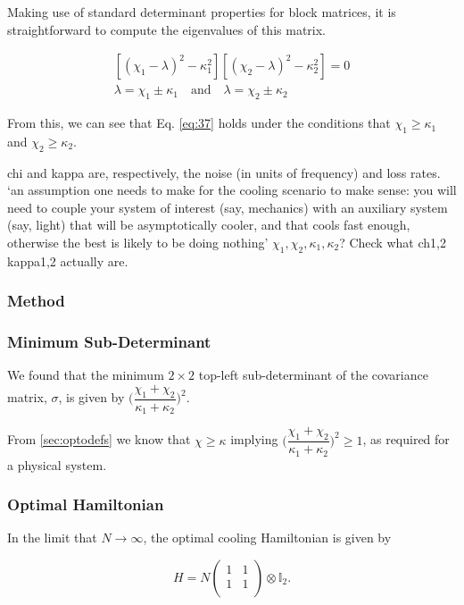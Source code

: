 \documentclass[11pt,a4paper]{article}
\numberwithin{equation}{section}
\begin{document}
	Making use of standard determinant properties for block matrices, it is straightforward to compute the eigenvalues of this matrix.
	
	\begin{align*}
	&[(\chi_1- \lambda)^2 - \kappa_1^2][(\chi_2- \lambda)^2 - \kappa_2^2]=0&\\
	&\lambda=\chi_1\pm\kappa_1 \quad\text{and}\quad \lambda=\chi_2\pm\kappa_2&
	\end{align*}
	
	From this, we can see that Eq. \ref{eq:37} holds under the conditions that $\chi_1 \geq \kappa_1$ and $\chi_2 \geq \kappa_2$.
	
	chi and kappa are, respectively, the noise (in units of frequency) and loss rates. `an assumption one needs to make for the cooling scenario to make sense: you will need to couple your system of interest (say, mechanics) with an auxiliary system (say, light) that will be asymptotically cooler, and that cools fast enough, otherwise the best is likely to be doing nothing' $\chi_1, \chi_2, \kappa_1, \kappa_2$? Check what ch1,2 kappa1,2 actually are.
	
	
	\color{red}\subsubsection{Method}\color{black}
	\label{sec:twomodegeneralmethod}	

	\subsubsection{Minimum Sub-Determinant}
	We found that the minimum $2 \times 2$ top-left sub-determinant of the covariance matrix, $\sigma$, is given by $\Big(\dfrac{\chi_1 + \chi_2}{\kappa_1 + \kappa_2}\Big)^2$.  
	
	From \ref{sec:optodefs} we know that $\chi \geq \kappa$ implying $\Big(\dfrac{\chi_1 + \chi_2}{\kappa_1 + \kappa_2}\Big)^2 \geq 1$, as required for a physical system. 
	
	\subsubsection{Optimal Hamiltonian}
	
	In the limit that $N \rightarrow \infty$, the optimal cooling Hamiltonian is given by
	
	\begin{equation*}
	H = N \begin{pmatrix}
	1 & 1 \\
	1 & 1\\
	\end{pmatrix} \otimes \mathbb{I}_2.
	\end{equation*}
\end{document}
